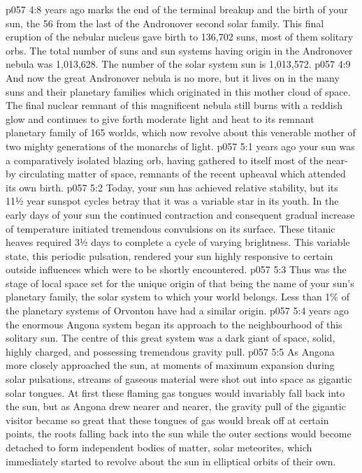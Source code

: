 \vs p057 4:8 \pc {} years ago marks the end of the terminal breakup and the birth of your sun, the 56 from the last of the Andronover second solar family. This final eruption of the nebular nucleus gave birth to 136,702 suns, most of them solitary orbs. The total number of suns and sun systems having origin in the Andronover nebula was 1,013,628. The number of the solar system sun is 1,013,572.
\vs p057 4:9 And now the great Andronover nebula is no more, but it lives on in the many suns and their planetary families which originated in this mother cloud of space. The final nuclear remnant of this magnificent nebula still burns with a reddish glow and continues to give forth moderate light and heat to its remnant planetary family of 165 worlds, which now revolve about this venerable mother of two mighty generations of the monarchs of light.
\vs p057 5:1  years ago your sun was a comparatively isolated blazing orb, having gathered to itself most of the near\hyp{}by circulating matter of space, remnants of the recent upheaval which attended its own birth.
\vs p057 5:2 Today, your sun has achieved relative stability, but its 11½ year sunspot cycles betray that it was a variable star in its youth. In the early days of your sun the continued contraction and consequent gradual increase of temperature initiated tremendous convulsions on its surface. These titanic heaves required 3½ days to complete a cycle of varying brightness. This variable state, this periodic pulsation, rendered your sun highly responsive to certain outside influences which were to be shortly encountered.
\vs p057 5:3 Thus was the stage of local space set for the unique origin of  that being the name of your sun’s planetary family, the solar system to which your world belongs. Less than 1\% of the planetary systems of Orvonton have had a similar origin.
\vs p057 5:4 \pc {} years ago the enormous Angona system began its approach to the neighbourhood of this solitary sun. The centre of this great system was a dark giant of space, solid, highly charged, and possessing tremendous gravity pull.
\vs p057 5:5 As Angona more closely approached the sun, at moments of maximum expansion during solar pulsations, streams of gaseous material were shot out into space as gigantic solar tongues. At first these flaming gas tongues would invariably fall back into the sun, but as Angona drew nearer and nearer, the gravity pull of the gigantic visitor became so great that these tongues of gas would break off at certain points, the roots falling back into the sun while the outer sections would become detached to form independent bodies of matter, solar meteorites, which immediately started to revolve about the sun in elliptical orbits of their own.
